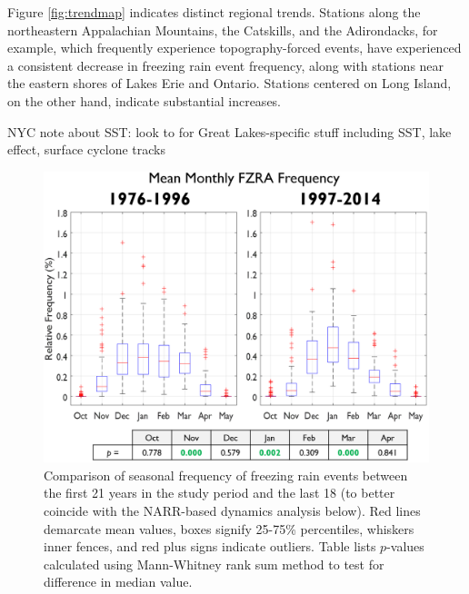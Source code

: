 \documentclass[twocol]{ametsoc}
\begin{document}
Figure \ref{fig:trendmap} indicates distinct regional trends. Stations along the northeastern Appalachian Mountains, the Catskills, and the Adirondacks, for example, which frequently experience topography-forced events, have experienced a consistent decrease in freezing rain event frequency, along with stations near the eastern shores of Lakes Erie and Ontario. Stations centered on Long Island, on the other hand, indicate substantial increases. 

NYC note about SST: \citet{ramos2006sensitivity}
look to \citet{cortinas2000climatology} for Great Lakes-specific stuff including SST, lake effect, surface cyclone tracks

\begin{figure}
\centering
\includegraphics[width=.9\textwidth]{Seasonal.PNG}
\caption{\label{fig:seasonal} Comparison of seasonal frequency of freezing rain events between the first 21 years in the study period and the last 18 (to better coincide with the NARR-based dynamics analysis below). Red lines demarcate mean values, boxes signify 25-75\% percentiles, whiskers inner fences, and red plus signs indicate outliers. Table lists $p$-values calculated using Mann-Whitney rank sum method to test for difference in median value.}
\end{figure}
\end{document}
